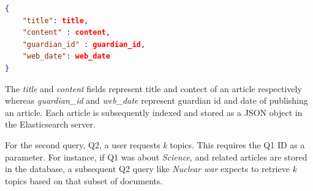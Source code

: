 \begin{lstlisting}[language=json, caption={JSON representation of a Guardian Article}, label={lst:article}]
{
    "title": title,
    "content" : content,
    "guardian_id" : guardian_id,
    "web_date": web_date
}
\end{lstlisting}

The \textit{title} and \textit{content} fields represent title and contect of an article respectively
whereas \textit{guardian\_id} and \textit{web\_date} represent guardian id and date of publishing
an article. Each article is subsequently indexed and stored as a JSON object in the Elasticsearch server.

For the second query, Q2, a user requests \textit{k} topics. This requires the Q1 ID as a parameter.
For instance, if Q1 was about \textit{Science}, and related articles are stored in the database,
a subsequent Q2 query like \textit{Nuclear war} expects to retrieve \textit{k} topics based on that
subset of documents.
